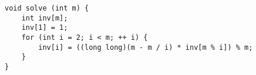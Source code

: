 \begin{lstlisting}
void solve (int m) {
	int inv[m];
	inv[1] = 1;
	for (int i = 2; i < m; ++ i) {
		inv[i] = ((long long)(m - m / i) * inv[m % i]) % m;
	}
}
\end{lstlisting}
